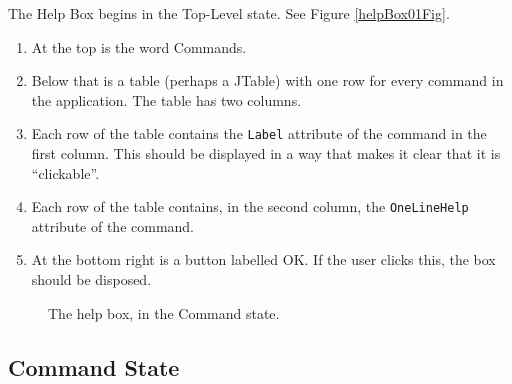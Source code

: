 \documentclass[11pt]{article}
\begin{document}
The Help Box begins in the Top-Level state.
See Figure \ref{helpBox01Fig}.
\begin{enumerate}
\item At the top is the word Commands.
\item Below that is a table (perhaps a JTable) with one row
  for every command in the application.  The table has two columns.
\item Each row of the table contains the {\tt Label} attribute of
  the command in the first column.  This should be displayed in a
  way that makes it clear that it is ``clickable''.
\item Each row of the table contains, in the second column, the
  {\tt OneLineHelp} attribute of the command.
\item At the bottom right is a button labelled OK.  If the user
  clicks this, the box should be disposed.
\end{enumerate}

\begin{figure}

\centerline{\epsfxsize=4in }

\caption{
  The help box, in the Command state.
}
\label{helpBox02Fig}
\end{figure}

\subsection{Command State}
\end{document}
